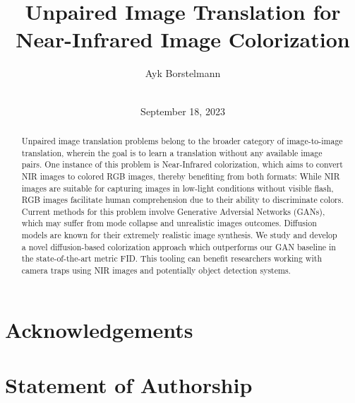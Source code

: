 \documentclass[ba,logo]{ivs-thesis}
\title{Unpaired Image Translation for Near-Infrared Image Colorization}
\author{Ayk Borstelmann\\\birthinfo{March 28, 2002 in Aschaffenburg}\\\matricnumber{3441004}}
\date{September 18, 2023}
\begin{document}
\frontmatter

\maketitle

\cleardoublepage
\begin{abstract}
	Unpaired image translation problems belong to the broader category of image-to-image translation, 
	wherein the goal is to learn a translation without any available image pairs. 
	One instance of this problem is Near-Infrared colorization, which aims to convert NIR images to colored RGB images,
	thereby benefiting from both formats:
	While NIR images are suitable for capturing images in low-light conditions without visible flash, 
	RGB images facilitate human comprehension due to their ability to discriminate colors. 
	Current methods for this problem involve Generative Adversial Networks (GANs), 
	which may suffer from mode collapse and unrealistic images outcomes. 
	Diffusion models are known for their extremely realistic image synthesis. 
	We study and develop a novel diffusion-based colorization approach which outperforms our GAN baseline in the state-of-the-art metric FID. 
	This tooling can benefit researchers working with camera traps using NIR images and potentially object detection systems.
\end{abstract}

\chapter*{Acknowledgements}

\cleardoublepage
\chapter*{Statement of Authorship}

% 

\cleardoublepage
\tableofcontents


\mainmatter









\begingroup

\backmatter

\printbibliography[heading=bibintoc]

\listoffigures

\listoftables

\endgroup

\appendix
\end{document}
